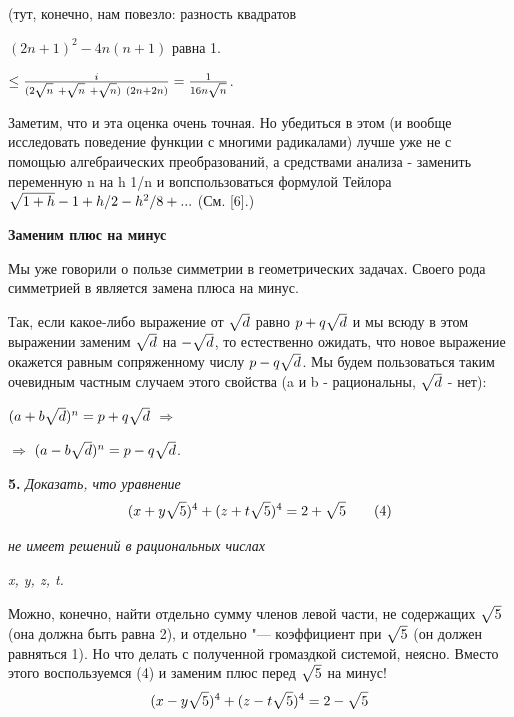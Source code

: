 \begin{multicols}{2}

\noindent (тут, конечно, нам повезло: разность квадратов 

\noindent $(2n + 1)^2 - 4n(n + 1)$ равна 1.

\noindent$\leq \frac {i}{(2\sqrt{n\mathstrut} \ + \sqrt{n\mathstrut} \ + \sqrt{n\mathstrut})\ (2n + 2n)} = \frac1{16n\sqrt{n\mathstrut}}$.

\bigskip

\scriptsize Заметим, что и эта оценка очень точная. Но убедиться в этом (и вообще исследовать поведение функции с многими радикалами) лучше уже 
не с помощью алгебраических преобразований, а средствами анализа - заменить переменную n на h 1/n и вопспользоваться формулой Тейлора
$\sqrt{1+h\mathstrut} - 1 + h/2 - h^2/8 + ...$ (См. [6].)
\normalsize
\bigskip\bigskip\bigskip\bigskip

\noindent \textbf{Заменим плюс на минус}

\medskip
\noindent Мы уже говорили о пользе симметрии в геометрических задачах. Своего рода
симметрией в  является замена плюса на минус.

Так, если какое-либо выражение от
$\sqrt{d\mathstrut}$ равно $p+q\sqrt{d\mathstrut}$ и мы всюду в этом
выражении заменим $\sqrt{d\mathstrut}$ на $-\sqrt{d\mathstrut}$, то
естественно ожидать, что новое выражение окажется равным сопряженному числу $p-q\sqrt{d\mathstrut}$. Мы будем пользоваться таким очевидным частным случаем этого 
свойства (a и b - рациональны, $\sqrt{d\mathstrut}$ -
нет):

\medskip
\noindent $(a + b\sqrt{d\mathstrut})^n = p + q\sqrt{d\mathstrut}$ $\Rightarrow$
\medskip

\leftskip=1cm
$\Rightarrow$ $(a - b\sqrt{d\mathstrut})^n = p - q\sqrt{d\mathstrut}$.

\leftskip=0cm
\smallskip

\textbf{5.} \textit{Доказать, что уравнение}
\[
(x + y\sqrt{5\mathstrut})^4 + (z + t\sqrt{5\mathstrut})^4 = 2 + \sqrt{5\mathstrut} \tag{4}
\]

\noindent \textit{не имеет решений в рациональных числах}

\noindent \textit{x, y, z, t.}

Можно, конечно, найти отдельно сумму
членов левой части, не содержащих $\sqrt{5\mathstrut}$
(она должна быть равна 2), и отдельно "---
коэффициент при $\sqrt{5\mathstrut}$ (он должен 
равняться 1). Но что делать с полученной
громаздкой системой, неясно. 
Вместо этого воспользуемся (4) и заменим
плюс перед $\sqrt{5\mathstrut}$ на минус!
\[
(x - y\sqrt{5\mathstrut})^4 + (z - t\sqrt{5\mathstrut})^4 = 2 - \sqrt{5\mathstrut}
\]


\end{multicols}
